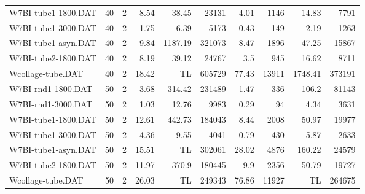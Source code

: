 \begin{center}
\begin{footnotesize}
\begin{longtable}{lrrrrrrrrr}
W7BI-tube1-1800.DAT & 40 & 2 & 8.54 & 38.45 & 23131 & 4.01 & 1146 & 14.83 & 7791\\
W7BI-tube1-3000.DAT & 40 & 2 & 1.75 & 6.39 & 5173 & 0.43 & 149 & 2.19 & 1263\\
W7BI-tube1-asyn.DAT & 40 & 2 & 9.84 & 1187.19 & 321073 & 8.47 & 1896 & 47.25 & 15867\\
W7BI-tube2-1800.DAT & 40 & 2 & 8.19 & 39.12 & 24767 & 3.5 & 945 & 16.62 & 8711\\
Wcollage-tube.DAT & 40 & 2 & 18.42 &  TL & 605729 & 77.43 & 13911 & 1748.41 & 373191\\
W7BI-rnd1-1800.DAT & 50 & 2 & 3.68 & 314.42 & 231489 & 1.47 & 336 & 106.2 & 81143\\
W7BI-rnd1-3000.DAT & 50 & 2 & 1.03 & 12.76 & 9983 & 0.29 & 94 & 4.34 & 3631\\
W7BI-tube1-1800.DAT & 50 & 2 & 12.61 & 442.73 & 184043 & 8.44 & 2008 & 50.97 & 19977\\
W7BI-tube1-3000.DAT & 50 & 2 & 4.36 & 9.55 & 4041 & 0.79 & 430 & 5.87 & 2633\\
W7BI-tube1-asyn.DAT & 50 & 2 & 15.51 &  TL & 302061 & 28.02 & 4876 & 160.22 & 24579\\
W7BI-tube2-1800.DAT & 50 & 2 & 11.97 & 370.9 & 180445 & 9.9 & 2356 & 50.79 & 19727\\
Wcollage-tube.DAT & 50 & 2 & 26.03 &  TL & 249343 & 76.86 & 11927 &  TL & 264675\\
\bottomrule
\end{longtable}
\end{footnotesize}
\end{center}
